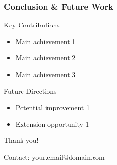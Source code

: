 \documentclass[
    9pt,
    aspectratio=169,
]{beamer}
\begin{document}
\begin{frame}
\frametitle{Conclusion \& Future Work}
\begin{block}{Key Contributions}
    \begin{itemize}
        \item Main achievement 1
        \item Main achievement 2
        \item Main achievement 3
    \end{itemize}
\end{block}

\begin{block}{Future Directions}
    \begin{itemize}
        \item Potential improvement 1
        \item Extension opportunity 1
    \end{itemize}
\end{block}

\begin{center}
\vspace{0.5cm}
\Large Thank you!

\normalsize
Contact: your.email@domain.com
\end{center}
\end{frame}
\end{document}
